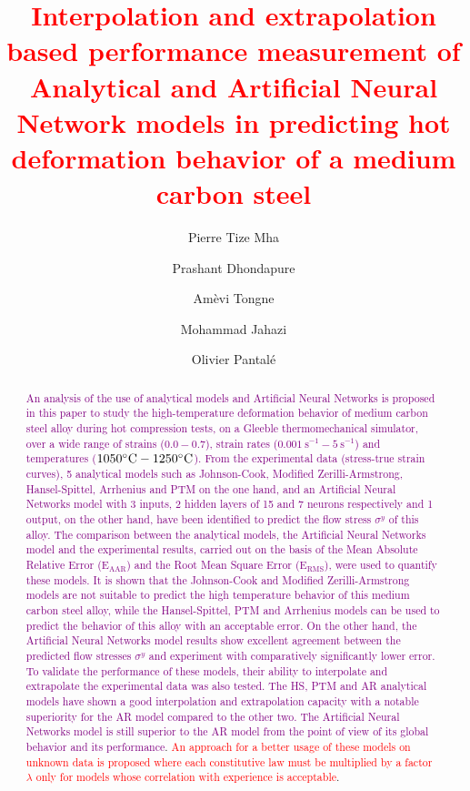 \documentclass[twoside,english,1p,final,sort&compress]{elsarticle}
\theoremstyle{plain}
\DeclareRobustCommand{\RMSE}{\text{E}_\text{RMS}}
\DeclareRobustCommand{\AARE}{\text{E}_\text{AAR}}
\DeclareRobustCommand{\ps}{\text{s}^{-1}}
\begin{document}
\begin{frontmatter}

\title{\textcolor{red}{Interpolation and extrapolation based performance measurement of Analytical and Artificial Neural Network models in predicting hot deformation behavior of a medium carbon steel}}

\author[LGP]{Pierre Tize Mha}
\author[ETS]{Prashant Dhondapure}
\author[LGP]{Amèvi Tongne}
\author[ETS]{Mohammad Jahazi}
\author[LGP]{Olivier Pantalé}


\address[LGP]{Laboratoire Génie de Production, INP/ENIT, Université de Toulouse, 47 Av d'Azereix, Tarbes, 65016, France}
\address[ETS]{École de Technologie Supérieure, 1100 Rue Notre Dame O, Montréal, QC H3C 1K3, Canada}

\begin{abstract}
\textcolor{purple}{An analysis of the use of analytical models and Artificial Neural Networks is proposed in this paper to study the high-temperature deformation behavior of medium carbon steel alloy during hot compression tests, on a Gleeble thermomechanical simulator, over a wide range of strains ($0.0-0.7$), strain rates ($0.001~\ps-5~\ps$) and temperatures ($1050\celsius-1250\celsius$). From the experimental data (stress-true strain curves), 5 analytical models such as Johnson-Cook, Modified Zerilli-Armstrong, Hansel-Spittel, Arrhenius and PTM on the one hand, and an Artificial Neural Networks model with 3 inputs, 2 hidden layers of 15 and 7 neurons respectively and 1 output, on the other hand, have been identified to predict the flow stress $\sigma^y$ of this alloy. The comparison between the analytical models, the Artificial Neural Networks model and the experimental results, carried out on the basis of the Mean Absolute Relative Error ($\AARE$) and the Root Mean Square Error ($\RMSE$), were used to quantify these models. It is shown that the Johnson-Cook and  Modified Zerilli-Armstrong models are not suitable to predict the high temperature behavior of this medium carbon steel alloy, while the Hansel-Spittel, PTM and Arrhenius models can be used to predict the behavior of this alloy with an acceptable error. On the other hand, the Artificial Neural Networks model results show excellent agreement between the predicted flow stresses $\sigma^y$ and experiment with comparatively significantly lower error. To validate the performance of these models, their ability to interpolate and extrapolate the experimental data was also tested. The HS, PTM and AR analytical models have shown a good interpolation and extrapolation capacity with a notable superiority for the AR model compared to the other two. The Artificial Neural Networks model is still superior to the AR model from the point of view of its global behavior and its performance}. \textcolor{red}{An approach for a better usage of these models on unknown data is proposed where each constitutive law must be multiplied by a factor $\lambda$ only for models whose correlation with experience is acceptable}.
\end{abstract}


\end{frontmatter}
\end{document}
